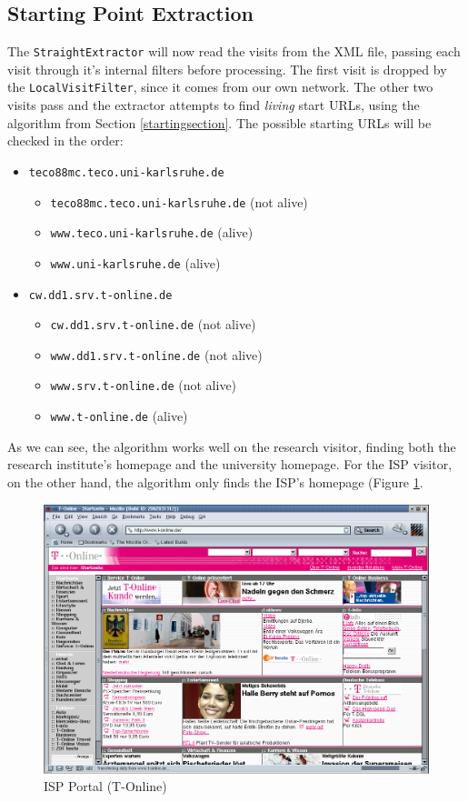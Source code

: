 \documentclass[a4paper]{danarticle}
\theoremstyle{remark}
\begin{document}
    \subsection{Starting Point Extraction}
      The \verb$StraightExtractor$ will now read the visits from the XML file,
      passing each visit through it's internal filters before processing. The
      first visit is dropped by the \verb$LocalVisitFilter$, since it comes
      from our own network. The other two visits pass and the extractor
      attempts to find \textit{living} start URLs, using the algorithm from
      Section \ref{startingsection}. The possible starting URLs will be checked in the
      order:
      \begin{itemize}
        \item{\verb$teco88mc.teco.uni-karlsruhe.de$}
        \begin{itemize}
          \item{\verb$teco88mc.teco.uni-karlsruhe.de$ (not alive)}
          \item{\verb$www.teco.uni-karlsruhe.de$ (alive)}
          \item{\verb$www.uni-karlsruhe.de$ (alive)}
        \end{itemize}
        \item{\verb$cw.dd1.srv.t-online.de$}
        \begin{itemize}
          \item{\verb$cw.dd1.srv.t-online.de$ (not alive)}
          \item{\verb$www.dd1.srv.t-online.de$ (not alive)}
          \item{\verb$www.srv.t-online.de$ (not alive)}
          \item{\verb$www.t-online.de$ (alive)}
        \end{itemize}
      \end{itemize}
      As we can see, the algorithm works well on the research visitor, finding
      both the research institute's homepage and the university homepage. For
      the ISP visitor, on the other hand, the algorithm only finds the ISP's
      homepage (Figure \ref{tolhome}.
      
      \begin{figure}[ht]
        \centering
        \includegraphics[width=12cm]{tolhome}
        \caption{ISP Portal (T-Online)}
        \label{tolhome}
      \end{figure}
      
\end{document}
